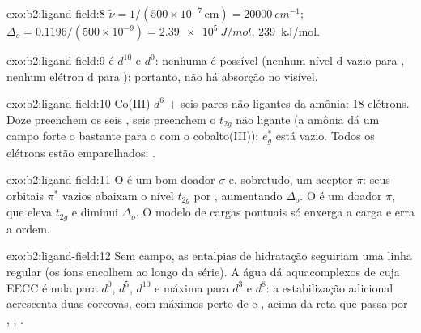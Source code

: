 \begin{solution}{exo:b2:ligand-field:8}
$\tilde\nu = 1/(500 \times 10^{-7}\,\text{cm}) = \qty{20000}{cm^{-1}}$; $\Delta_o =
0.1196/(500 \times 10^{-9}) = \qty{2.39e5}{J/mol}$, \qty{239}{kJ/mol}.
\end{solution}

\begin{solution}{exo:b2:ligand-field:9}
 é $d^{10}$ e  $d^0$: nenhuma  é possível (nenhum
nível d vazio para , nenhum elétron d para ); portanto, não há
absorção no visível.
\end{solution}

\begin{solution}{exo:b2:ligand-field:10}
Co(III) $d^6$ + seis pares não ligantes da amônia: 18 elétrons. Doze preenchem os
seis , seis preenchem o $t_{2g}$ não ligante (a amônia dá um
campo forte o bastante para o  com o cobalto(III)); $e_g^*$ está vazio.
Todos os elétrons estão emparelhados: .
\end{solution}

\begin{solution}{exo:b2:ligand-field:11}
O  é um bom doador $\sigma$ e, sobretudo, um aceptor $\pi$: seus orbitais
$\pi^*$ vazios abaixam o nível $t_{2g}$ por , aumentando $\Delta_o$. O
 é um doador $\pi$, que eleva $t_{2g}$ e diminui $\Delta_o$. O modelo de
cargas pontuais só enxerga a carga e erra a ordem.
\end{solution}

\begin{solution}{exo:b2:ligand-field:12}
Sem campo, as entalpias de hidratação seguiriam uma linha regular (os íons
encolhem ao longo da série). A água dá aquacomplexos de  cuja EECC é
nula para $d^0$, $d^5$, $d^{10}$ e máxima para $d^3$ e $d^8$: a estabilização
adicional acrescenta duas corcovas, com máximos perto de  e ,
acima da reta que passa por , , .
\end{solution}

